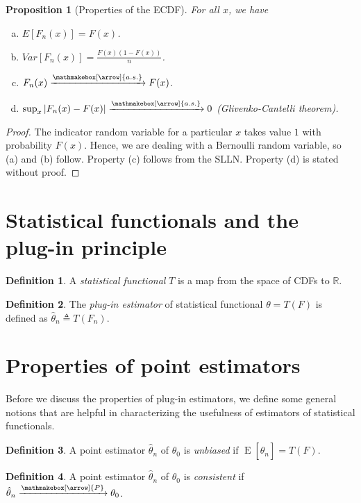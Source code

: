 \documentclass{book}
\theoremstyle{plain}%
\newtheorem{proposition}{Proposition}[section]
\theoremstyle{definition}
\newtheorem{definition}{Definition}[section]
\DeclareMathOperator{\E}{E}
\newlength{\arrow}
\newcommand*{\myrightarrow}[1]{\xrightarrow{\mathmakebox[\arrow]{#1}}}
\begin{document}
\begin{proposition}[Properties of the ECDF] For all $x$, we have
\begin{enumerate}[(a)]
\item $E[F_n(x)] = F(x)$.
\item $Var[F_n(x)] = \frac{F(x)(1-F(x))}{n}$.
\item $F_n(x) \myrightarrow{a.s.} F(x)$.
\item $\sup_x|F_n(x) - F(x)| \myrightarrow{a.s.} 0 $ \emph{(Glivenko-Cantelli theorem)}.
\end{enumerate}
\end{proposition}

\begin{proof}
The indicator random variable for a particular $x$ takes value $1$ with probability $F(x)$. Hence, we are dealing with a Bernoulli random variable, so (a) and (b) follow. Property (c) follows from the SLLN. Property (d) is stated without proof.
\end{proof}

\section{Statistical functionals and the plug-in principle}

\begin{definition}
A \textit{statistical functional} $T$ is a map from the space of CDFs to $\mathbb{R}$.
\end{definition}

\begin{definition}
The \textit{plug-in estimator} of statistical functional $\theta = T(F)$ is defined as $\hat{\theta}_n \triangleq T(F_n)$.
\end{definition}

\section{Properties of point estimators}
Before we discuss the properties of plug-in estimators, we define some general notions that are helpful in characterizing the usefulness of estimators of statistical functionals.

\begin{definition} A point estimator $\hat{\theta}_n$ of $\theta_0$ is \textit{unbiased} if $\E[\hat{\theta}_n] = T(F)$.
\end{definition}

\begin{definition} A point estimator $\hat{\theta}_n$ of $\theta_0$ is \textit{consistent} if $\hat{\theta}_n \myrightarrow{P} \theta_0$.
\end{definition}
\end{document}
